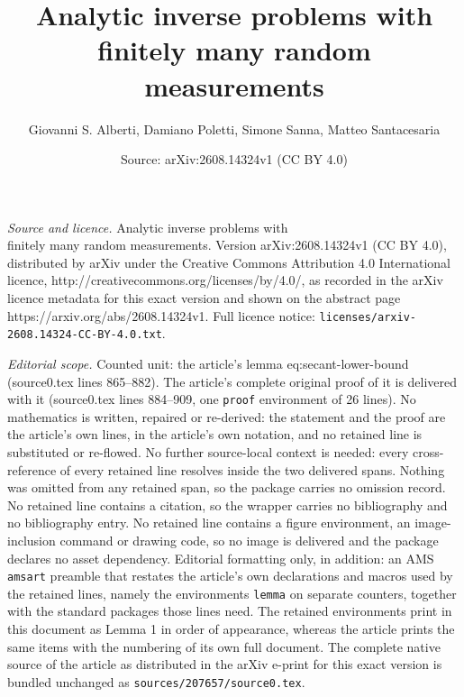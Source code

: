 \documentclass[10pt,a4paper]{amsart}
\title{Analytic inverse problems with\\ finitely many random measurements}
\author{Giovanni S. Alberti, Damiano Poletti, Simone Sanna, Matteo Santacesaria}
\date{Source: arXiv:2608.14324v1 (CC BY 4.0)}
\newtheorem{lemma}{Lemma}
\newcommand{\calM}{\mathcal{M}}
\newcommand{\calS}{\mathcal{S}}
\newcommand{\calT}{\mathcal{T}}
\newcommand{\norm}[1]{\left\lVert #1\right\rVert}
\begin{document}
\maketitle

\noindent\emph{Source and licence.} Analytic inverse problems with\\ finitely many random measurements. Version arXiv:2608.14324v1 (CC BY 4.0), distributed by arXiv under the Creative Commons Attribution 4.0 International licence, http://creativecommons.org/licenses/by/4.0/, as recorded in the arXiv licence metadata for this exact version and shown on the abstract page https://arxiv.org/abs/2608.14324v1. Full licence notice: \texttt{licenses/arxiv-2608.14324-CC-BY-4.0.txt}.\par\smallskip

\noindent\textit{Editorial scope.} Counted unit: the article's lemma eq:secant-lower-bound (source0.tex lines 865--882). The article's complete original proof of it is delivered with it (source0.tex lines 884--909, one \texttt{proof} environment of 26 lines). No mathematics is written, repaired or re-derived: the statement and the proof are the article's own lines, in the article's own notation, and no retained line is substituted or re-flowed.  No further source-local context is needed: every cross-reference of every retained line resolves inside the two delivered spans.  Nothing was omitted from any retained span, so the package carries no omission record.  No retained line contains a citation, so the wrapper carries no bibliography and no bibliography entry.  No retained line contains a figure environment, an image-inclusion command or drawing code, so no image is delivered and the package declares no asset dependency.  Editorial formatting only, in addition: an AMS \texttt{amsart} preamble that restates the article's own declarations and macros used by the retained lines, namely the environments \texttt{lemma} on separate counters, together with the standard packages those lines need.  The retained environments print in this document as Lemma 1 in order of appearance, whereas the article prints the same items with the numbering of its own full document.  The complete native source of the article as distributed in the arXiv e-print for this exact version is bundled unchanged as \texttt{sources/207657/source0.tex}.
\end{document}
